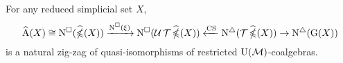 \begin{theorem}
	For any reduced simplicial set $X$,
	\[
	\adamsE(X) \cong
	\cchains(\ccobarE(X)) \xra{\cchains(\xi)}
	\cchains(\cubify{\triangulate\ccobarE(X)}) \xla{\CS}
	\schains(\triangulate\ccobarE(X)) \to
	\schains(\kan(X))
	\]
	is a natural zig-zag of quasi-isomorphisms of restricted $\UM$-coalgebras.
\end{theorem}